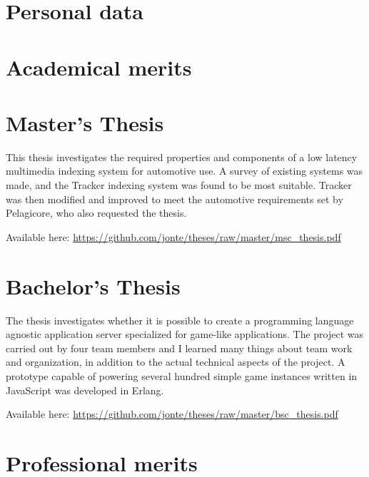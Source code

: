 \documentclass{twocolcv}
\begin{document}
\section*{Personal data}
\section*{Academical merits}

\section*{Master's Thesis}
This thesis investigates the required properties and components of a low latency multimedia indexing system for automotive use. A survey of existing systems was made, and the Tracker indexing system was found to be most suitable. Tracker was then modified and improved to meet the automotive requirements set by Pelagicore, who also requested the thesis.

\noindent Available here: \url{https://github.com/jonte/theses/raw/master/msc_thesis.pdf}
\section*{Bachelor's Thesis}
The thesis investigates whether it is possible to create a programming language agnostic application server specialized for game-like applications. The project was carried out by four team members and I learned many things about team work and organization, in addition to the actual technical aspects of the project. A prototype capable of powering several hundred simple game instances written in JavaScript was developed in Erlang.

\noindent Available here: \url{https://github.com/jonte/theses/raw/master/bsc_thesis.pdf}
\section*{Professional merits}
\end{document}

